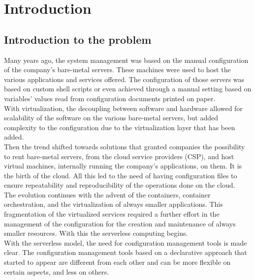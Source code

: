 
\chapter{Introduction}
\label{cap:introduction}


\section{Introduction to the problem}
Many years ago, the system management was based on the manual configuration of the company's bare-metal servers.
These machines were used to host the various applications and services offered.
The configuration of those servers was based on custom shell scripts or even achieved through a manual setting based on variables' values read from configuration documents printed on paper.\\
With virtualization, the decoupling between software and hardware allowed for scalability of the software on the various bare-metal servers, but added complexity to the configuration due to the virtualization layer that has been added.\\
Then the trend shifted towards solutions that granted companies the possibility to rent bare-metal servers, from the cloud service providers (CSP), and host virtual machines, internally running the company's applications, on them.
It is the birth of the cloud.
All this led to the need of having configuration files to ensure repeatability and reproducibility of the operations done on the cloud.\\
The evolution continues with the advent of the containers, container orchestration, and the virtualization of always smaller applications.
This fragmentation of the virtualized services required a further effort in the management of the configuration for the creation and maintenance of always smaller resources.
With this the serverless computing begins.\\
With the serverless model, the need for configuration management tools is made clear.
The configuration management tools based on a declarative approach that started to appear are different from each other and can be more flexible on certain aspects, and less on others.
